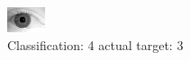 \begin{figure}[h!]
\begin{center}
\includegraphics[width=0.60\columnwidth]{figures/ID2206_class_4_target_3.png}
\end{center}
\caption{ Classification: 4 actual target: 3}
\label{fig:ID2206_class_4_target_3}
\end{figure}
